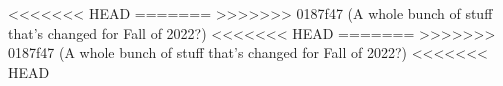 \documentclass{../../oss-apphys-exam}
\begin{document}
\begin{multicols*}{2}
\begin{questions}
<<<<<<< HEAD
=======
>>>>>>> 0187f47 (A whole bunch of stuff that's changed for Fall of 2022?)
%      
%
%
%    
<<<<<<< HEAD
=======
>>>>>>> 0187f47 (A whole bunch of stuff that's changed for Fall of 2022?)
%    
<<<<<<< HEAD
%

\end{questions}
\end{multicols*}
\end{document}
